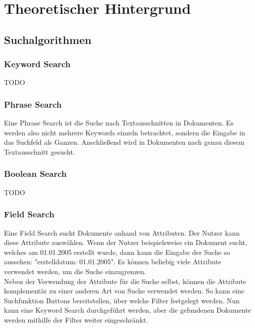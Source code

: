 \chapter{Theoretischer Hintergrund}

\section{Suchalgorithmen}

\subsection{Keyword Search}
TODO

\subsection{Phrase Search}
Eine Phrase Search ist die Suche nach Textausschnitten in Dokumenten.
Es werden also nicht mehrere Keywords einzeln betrachtet, sondern die Eingabe in das Suchfeld als Ganzen.
Anschließend wird in Dokumenten nach genau diesem Textausschnitt gesucht.

\subsection{Boolean Search}
TODO

\subsection{Field Search}
Eine Field Search sucht Dokumente anhand von Attributen.
Der Nutzer kann diese Attribute auswählen.
Wenn der Nutzer beispielsweise ein Dokument sucht, welches am 01.01.2005 erstellt wurde, dann kann die Eingabe der Suche so aussehen: "erstelldatum: 01.01.2005".
Es können beliebig viele Attribute verwendet werden, um die Suche einzugrenzen.\\

Neben der Verwendung der Attribute für die Suche selbst, können die Attribute komplementär zu einer anderen Art von Suche verwendet werden.
So kann eine Suchfunktion Buttons bereitstellen, über welche Filter festgelegt werden.
Nun kann eine Keyword Search durchgeführt werden, aber die gefundenen Dokumente werden mithilfe der Filter weiter eingeschränkt.


